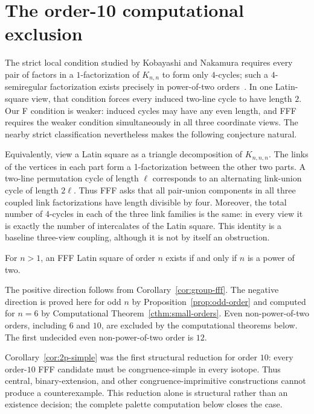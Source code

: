 \section{The order-10 computational exclusion}

The strict local condition studied by Kobayashi and Nakamura requires every
pair of factors in a $1$-factorization of $K_{n,n}$ to form only $4$-cycles;
such a $4$-semiregular factorization exists precisely in power-of-two
orders~\cite{KobayashiNakamura1994}.  In one Latin-square view, that condition
forces every induced two-line cycle to have length $2$.  Our F condition is
weaker: induced cycles may have any even length, and FFF requires the weaker
condition simultaneously in all three coordinate views.  The nearby strict
classification nevertheless makes the following conjecture natural.

Equivalently, view a Latin square as a triangle decomposition of
$K_{n,n,n}$.  The links of the vertices in each part form a 1-factorization
between the other two parts.  A two-line permutation cycle of length $\ell$
corresponds to an alternating link-union cycle of length $2\ell$.  Thus FFF
asks that all pair-union components in all three coupled link factorizations
have length divisible by four.  Moreover, the total number of 4-cycles in
each of the three link families is the same: in every view it is exactly the
number of intercalates of the Latin square.  This identity is a baseline
three-view coupling, although it is not by itself an obstruction.

\begin{conjecture}\label{conj:power-two}
For $n>1$, an FFF Latin square of order $n$ exists if and only if $n$ is a
power of two.
\end{conjecture}

The positive direction follows from Corollary~\ref{cor:group-fff}.  The
negative direction is proved here for odd $n$ by
Proposition~\ref{prop:odd-order} and computed for $n=6$ by
Computational Theorem~\ref{cthm:small-orders}.  Even non-power-of-two orders,
including $6$ and $10$, are excluded by the computational theorems below.
The first undecided even non-power-of-two order is $12$.

Corollary~\ref{cor:2p-simple} was the first structural reduction for order
$10$: every order-$10$
FFF candidate must be congruence-simple in every isotope.  Thus central,
binary-extension, and other congruence-imprimitive constructions cannot
produce a counterexample.  This reduction alone is structural rather than an
existence decision; the complete palette computation below closes the case.

